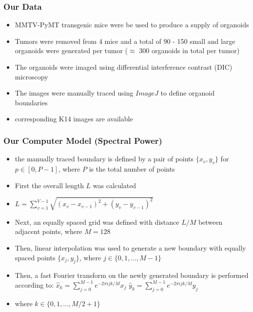 \documentclass{beamer} %
\begin{document}
\begin{frame}
	\frametitle{Our Data}
	\begin{itemize}
			\item MMTV-PyMT transgenic mice were be used to produce a supply of organoids
			\item Tumors were removed from 4 mice and a total of 90 - 150 small and large organoids were generated per tumor ($\approx$ 300 organoids in total per tumor)
			\item The organoids were imaged using differential interference contrast (DIC) microscopy
			\item The images were manually traced using \alert{$ImageJ$} to define organoid boundaries
			\item corresponding K14 images are available
	\end{itemize}
\end{frame}

\begin{frame}
	\frametitle{Our Computer Model (Spectral Power)}
	\begin{itemize}
		\item the manually traced boundary is defined by a pair of points \(\{x_v, y_v\}\) for $p \in [0, P-1]$, where $P$ is the total number of points
		\item First the overall length $L$ was calculated
		\item $L = \sum_{v=1}^{V-1} \sqrt{(x_v - x_{v-1})^2 + (y_v - y_{v-1})^2}$
		\item Next, an equally spaced grid was defined with distance $L/M$ between adjacent points, where $M=128$
		\item Then, linear interpolation was used to generate a new boundary with equally spaced points \(\{x_j, y_j\}\), where $j \in \{0,1,...,M-1\}$  
	\end{itemize}
\end{frame}

\begin{frame}
	\begin{itemize}
			\item Then, a fast Fourier transform on the newly generated boundary is performed according to:
			\newline
			$\hat{x}_k = \sum_{j=0}^{M-1} e^{-2\pi ijk/M} x_j$ 
			\newline
			$\hat{y}_k = \sum_{j=0}^{M-1} e^{-2\pi ijk/M} y_j$ 
			\item where $k \in \{0,1,...,M/2+1\}$
	\end{itemize}
\end{frame}
\end{document}
